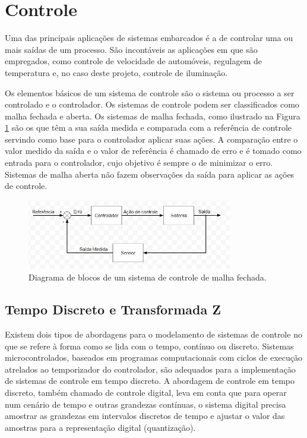 \section{Controle}

Uma das principais aplicações de sistemas embarcados é a de controlar uma ou mais saídas de um processo. São incontáveis as aplicações em que são empregados, como controle de velocidade de automóveis, regulagem de temperatura e, no caso deste projeto, controle de iluminação. 

Os elementos básicos de um sistema de controle são o sistema ou processo a ser controlado e o controlador. Os sistemas de controle podem ser classificados como malha fechada e aberta. Os sistemas de malha fechada, como ilustrado na Figura \ref{malha} são os que têm a sua saída medida e comparada com a referência de controle servindo como base para o controlador aplicar suas ações. A comparação entre o valor medido da saída e o valor de referência é chamado de erro e é tomado como entrada para o controlador, cujo objetivo é sempre o de minimizar o erro. Sistemas de malha aberta não fazem observações da saída para aplicar as ações de controle.

\begin{figure}[ht]
    \begin{center}
    \includegraphics[width=0.8\textwidth]{figuras/malha.JPG}
    \end{center}
    \caption[Diagrama de blocos um sistema de controle de malha fechada.]{Diagrama de blocos de um sistema de controle de malha fechada.}
    \label{malha}
\end{figure}

\subsection{Tempo Discreto e Transformada Z}

Existem dois tipos de abordagens para o modelamento de sistemas de controle no que se refere à forma como se lida com o tempo, contínuo ou discreto. Sistemas microcontrolados, baseados em programas computacionais com ciclos de execução atrelados ao temporizador do controlador, são adequados para a implementação de sistemas de controle em tempo discreto. A abordagem de controle em tempo discreto, também chamado de controle digital, leva em conta que para operar num cenário de tempo e outras grandezas contínuas, o sistema digital precisa amostrar as grandezas em intervalos discretos de tempo e ajustar o valor das amostras para a representação digital (quantização). 

